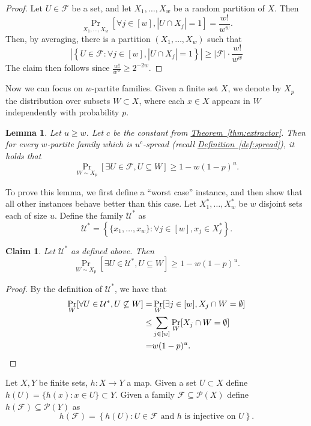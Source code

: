 \documentclass[11pt]{article}
\numberwithin{equation}{section}
\newtheorem{lemma}[theorem]{Lemma}
\newtheorem{claim}[theorem]{Claim}
\theoremstyle{definition}
\theoremstyle{plain}
\newcommand{\expref}[2]{\hyperref[#2]{#1~\ref{#2}}}
\newcommand{\calF}{\mathcal{F}} %
\begin{document}
\begin{proof}
Let $U\in\calF$ be a set, and let $X_1,\dots,X_w$ be a random partition of
$X$. Then
$$
\Pr_{X_{1}, \ldots, X_{w}}\left[\forall j\in[w], |U\cap X_{j}|=1\right] = \frac{w!}{w^{w}}.
$$
Then, by %
averaging,  %
there is a partition $(X_1, \ldots,X_{w})$ such that
$$
\left|\left\{U\in\calF:\forall j\in[w], |U\cap X_{j}|= 1 \right\}\right| \geq |\calF|\cdot\frac{w!}{w^w}
$$
The claim then follows since $\frac{w!}{w^w} \geq 2^{-2 w}$.
\end{proof}

Now we can focus on %
$w$-partite families.  %
Given a finite set $X$, we denote by $X_p$ the distribution over subsets $W \subset X$,
where each $x \in X$ appears in $W$ independently with probability $p$.

\begin{lemma}
\label{lemma:existence}
Let $u \ge w$. Let $c$ be the constant from \expref{Theorem}{thm:extractor}.
Then for every %
$w$-partite family  %
which is $u^c$-spread (recall \expref{Definition}{def:spread}), it holds that
$$
\Pr_{W\sim X_p}[\exists U\in\calF, U\subseteq W]\geq 1-w (1-p)^{u}.
$$
\end{lemma}

To prove this lemma, we first define a ``worst case'' instance, and then show that all other instances behave better than this case.
Let $X_{1}^*, \ldots,X_{w}^*$ be $w$ disjoint sets each of size $u$. Define the family $\mathcal{U}^*$ as
$$
\mathcal{U}^* = \left\{\{x_{1}, \ldots,x_{w}\}:\forall j\in[w], x_{j}\in X^*_{j}\right\}.
$$
\begin{claim}
\label{claim:worstcase}
Let $\mathcal{U}^*$ as defined above. Then
$$
\Pr_{W\sim X_{p}}[\exists U\in\mathcal{U}^*, U\subseteq W]\geq 1-w (1-p)^{u}.
$$
\end{claim}

\begin{proof}
By the definition of $\mathcal{U}^*$, we have that
\begin{align*}
\Pr_{W}[\forall U\in\mathcal{U}^*, U\not\subseteq W]=& \Pr_{W}[\exists j\in[w], X_{j}\cap W =\emptyset] \\
\leq&\sum_{j\in[w]} \Pr_{W}[X_{j}\cap W =\emptyset]\\
=& w (1-p)^{u}.    \qedhere  %
\end{align*}
\end{proof}

Let $X,Y$ be finite sets, $h:X \to Y$ a map. Given a set $U \subset X$ define $h(U)=\{h(x): x \in U\} \subset Y$.
Given a family $\calF \subseteq \mathcal{P}(X)$ define $h(\calF) \subseteq \mathcal{P}(Y)$ as
$$
h(\calF) = \left\{h(U): U \in \calF \text{ and } h \text{ is injective on } U \right\}.
$$
\end{document}
